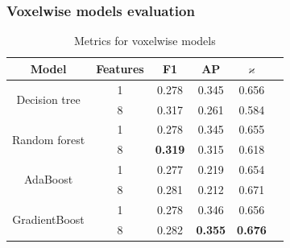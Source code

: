 \documentclass{beamer}
\begin{document}
\begin{frame}
    \frametitle{Voxelwise models evaluation}
    \begin{table}[ht]
        \centering
        \begin{tabular}{|c|c|c|c|c|c| }
            \hline
            \textbf{Model}                 & \textbf{Features} & \textbf{F1}    & \textbf{AP}    & \( \mathbf{\varkappa} \) \\
            \hline
            \multirow{2}{*}{Decision tree} & 1                 & 0.278          & 0.345          & 0.656                    \\
                                           & 8                 & 0.317          & 0.261          & 0.584                    \\
            \hline
            \multirow{2}{*}{Random forest}
                                           & 1                 & 0.278          & 0.345          & 0.655                    \\
                                           & 8                 & \textbf{0.319} & 0.315          & 0.618                    \\
            \hline
            \multirow{2}{*}{AdaBoost}
                                           & 1                 & 0.277          & 0.219          & 0.654                    \\
                                           & 8                 & 0.281          & 0.212          & 0.671                    \\
            \hline
            \multirow{2}{*}{GradientBoost}
                                           & 1                 & 0.278          & 0.346          & 0.656                    \\
                                           & 8                 & 0.282          & \textbf{0.355} & \textbf{0.676}           \\
            \hline
        \end{tabular}
        \caption{Metrics for voxelwise models}
        \label{tab:voxelwise_metrics}
    \end{table}
\end{frame}
\end{document}
